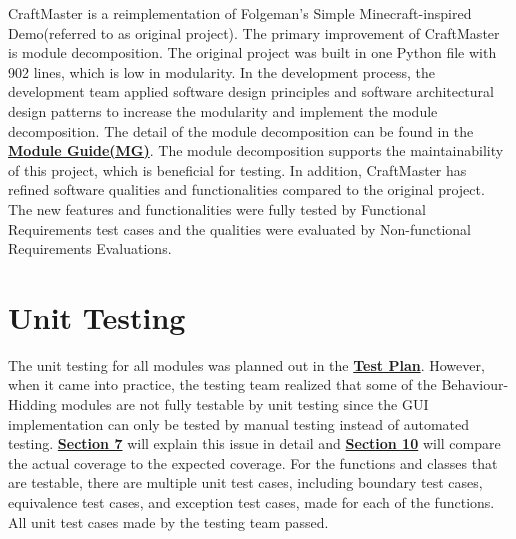 \documentclass[12pt, titlepage]{article}
\begin{document}
CraftMaster is a reimplementation of Folgeman's Simple Minecraft-inspired Demo(referred to as original project)\cite{mine}. The primary improvement of CraftMaster is module decomposition. The original project was built in one Python file with 902 lines, which is low in modularity. In the development process, the development team applied software design principles and software architectural design patterns to increase the modularity and implement the module decomposition. The detail of the module decomposition can be found in the \href{https://gitlab.cas.mcmaster.ca/wangs132/minecraft/-/blob/master/Doc/Design/MG/MG.pdf}{\bf Module Guide(MG)}. The module decomposition supports the maintainability of this project, which is beneficial for testing. In addition, CraftMaster has refined software qualities and functionalities compared to the original project. The new features and functionalities were fully tested by Functional Requirements test cases and the qualities were evaluated by Non-functional Requirements Evaluations.

\section{Unit Testing}
The unit testing for all modules was planned out in the \href{https://gitlab.cas.mcmaster.ca/wangs132/minecraft/-/blob/master/Doc/TestPlan/TestPlan.pdf}{\bf Test Plan}. However, when it came into practice, the testing team realized that some of the Behaviour-Hidding modules are not fully testable by unit testing since the GUI implementation can only be tested by manual testing instead of automated testing. \hyperref[auto]{\bf Section 7} will explain this issue in detail and \hyperref[auto]{\bf Section 10} will compare the actual coverage to the expected coverage. For the functions and classes that are testable, there are multiple unit test cases, including boundary test cases, equivalence test cases, and exception test cases, made for each of the functions. All unit test cases made by the testing team passed.
\end{document}
